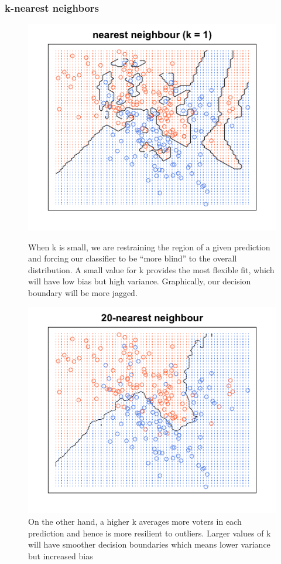 \documentclass{beamer}
\begin{document}
\begin{frame}
\frametitle{k-nearest neighbors}
\begin{figure}


\begin{minipage}{.5\textwidth}
  \centering
\includegraphics[width=1\linewidth]{figures/03/1nearestneighbor.png}
\caption{ \tiny When k is small, we are restraining the region of a given prediction and forcing our classifier to be “more blind” to the overall distribution. A small value for k provides the most flexible fit, which will have low bias but high variance. Graphically, our decision boundary will be more jagged.}
\end{minipage}%
\begin{minipage}{.5\textwidth}
\includegraphics[width=1\linewidth]{figures/03/20nearestneighbor.png}
\caption{ \tiny On the other hand, a higher k averages more voters in each prediction and hence is more resilient to outliers. Larger values of k will have smoother decision boundaries which means lower variance but increased bias}
\end{minipage}
\end{figure}


\end{frame}
\end{document}
